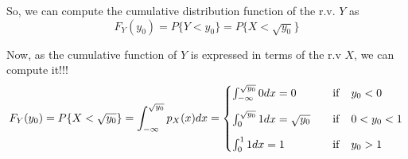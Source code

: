 So, we can compute the cumulative distribution function of the r.v. $Y$ as
$$ F_Y(y_0) =  P\{Y<y_0\} =  P\{X<\sqrt{y_0}\}$$

Now, as the cumulative function of $Y$ is expressed in terms of the r.v $X$, we can compute it!!!
\begin{eqnarray} 
F_Y(y_0) =  P\{X<\sqrt{y_0}\} = \int_{-\infty}^{\sqrt{y_0}} p_X(x) dx = 
\begin{cases}
\int_{-\infty}^{\sqrt{y_0}} 0 dx = 0 & \quad {\rm if} \quad y_0 <0 \\[2ex]
\int_0^{\sqrt{y_0}} 1 dx = \sqrt{y_0} & \quad {\rm if} \quad 0< y_0 <1 \\[2ex]
\int_0^{1} 1 dx = 1 & \quad {\rm if} \quad y_0 >1 \\
\end{cases}  \nonumber
\end{eqnarray}

